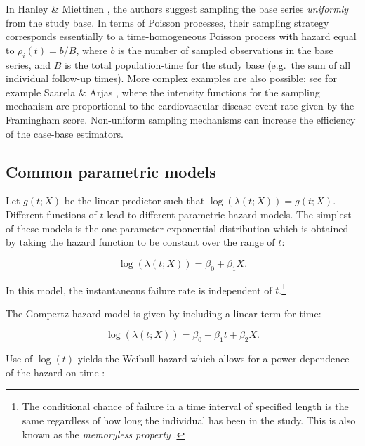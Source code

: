 In Hanley \& Miettinen \citeyearpar{hanley2009fitting}, the authors
suggest sampling the base series \emph{uniformly} from the study base.
In terms of Poisson processes, their sampling strategy corresponds
essentially to a time-homogeneous Poisson process with hazard equal to
\(\rho_i(t) = b/B\), where \(b\) is the number of sampled observations
in the base series, and \(B\) is the total population-time for the study
base (e.g.~the sum of all individual follow-up times). More complex
examples are also possible; see for example Saarela \& Arjas
\citeyearpar{saarela2015non}, where the intensity functions for the
sampling mechanism are proportional to the cardiovascular disease event
rate given by the Framingham score. Non-uniform sampling mechanisms can
increase the efficiency of the case-base estimators.

\hypertarget{common-parametric-models}{%
\subsection{Common parametric models}\label{common-parametric-models}}

Let \(g(t; X)\) be the linear predictor such that
\(\log(\lambda(t;X)) = g(t; X)\). Different functions of \(t\) lead to
different parametric hazard models. The simplest of these models is the
one-parameter exponential distribution which is obtained by taking the
hazard function to be constant over the range of \(t\):

\begin{equation}
\log(\lambda(t; X)) = \beta_0 + \beta_1 X. \label{eq:exp}
\end{equation}

In this model, the instantaneous failure rate is independent of
\(t\).\footnote{The conditional chance of failure in a time interval of specified length is the same regardless of how long the individual has been in the study. This is also known as the \textit{memoryless property} \citep{kalbfleisch2011statistical}.}

The Gompertz hazard model is given by including a linear term for time:

\begin{equation}
\log(\lambda(t; X)) = \beta_0 + \beta_1 t + \beta_2 X. \label{eq:gomp}
\end{equation}

Use of \(\log(t)\) yields the Weibull hazard which allows for a power
dependence of the hazard on time \citep{kalbfleisch2011statistical}:

